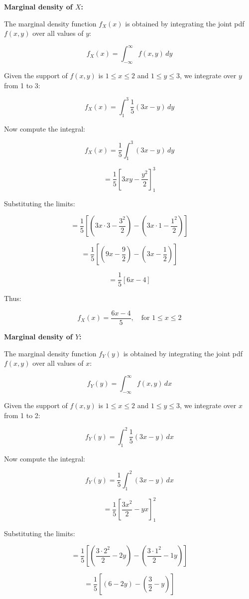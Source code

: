 \documentclass{article}
\begin{document}
\textbf{Marginal density of \(X\):}

The marginal density function \(f_X(x)\) is obtained by integrating the joint pdf \(f(x, y)\) over all values of \(y\):

\[
f_X(x) = \int_{-\infty}^{\infty} f(x, y) \, dy
\]

Given the support of \(f(x, y)\) is \(1 \leq x \leq 2\) and \(1 \leq y \leq 3\), we integrate over \(y\) from 1 to 3:

\[
f_X(x) = \int_{1}^{3} \frac{1}{5}(3x - y) \, dy
\]

Now compute the integral:

\[
f_X(x) = \frac{1}{5} \int_{1}^{3} (3x - y) \, dy
\]

\[
= \frac{1}{5} \left[ 3x y - \frac{y^2}{2} \right]_{1}^{3}
\]

Substituting the limits:

\[
= \frac{1}{5} \left[ \left(3x \cdot 3 - \frac{3^2}{2}\right) - \left(3x \cdot 1 - \frac{1^2}{2}\right) \right]
\]

\[
= \frac{1}{5} \left[ (9x - \frac{9}{2}) - (3x - \frac{1}{2}) \right]
\]

\[
= \frac{1}{5} \left[ 6x - 4 \right]
\]

Thus:

\[
f_X(x) = \frac{6x - 4}{5}, \quad \text{for } 1 \leq x \leq 2
\]

\textbf{Marginal density of \(Y\):}

The marginal density function \(f_Y(y)\) is obtained by integrating the joint pdf \(f(x, y)\) over all values of \(x\):

\[
f_Y(y) = \int_{-\infty}^{\infty} f(x, y) \, dx
\]

Given the support of \(f(x, y)\) is \(1 \leq x \leq 2\) and \(1 \leq y \leq 3\), we integrate over \(x\) from 1 to 2:

\[
f_Y(y) = \int_{1}^{2} \frac{1}{5}(3x - y) \, dx
\]

Now compute the integral:

\[
f_Y(y) = \frac{1}{5} \int_{1}^{2} (3x - y) \, dx
\]

\[
= \frac{1}{5} \left[ \frac{3x^2}{2} - yx \right]_{1}^{2}
\]

Substituting the limits:

\[
= \frac{1}{5} \left[ \left(\frac{3 \cdot 2^2}{2} - 2y\right) - \left(\frac{3 \cdot 1^2}{2} - 1y\right) \right]
\]

\[
= \frac{1}{5} \left[ \left(6 - 2y\right) - \left(\frac{3}{2} - y\right) \right]
\]
\end{document}
